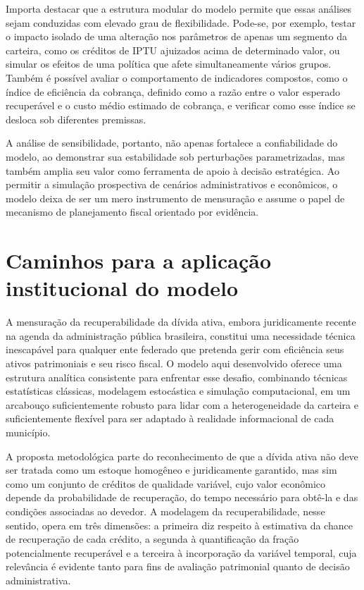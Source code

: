 \documentclass[a4paper,12pt]{article}
\begin{document}
Importa destacar que a estrutura modular do modelo permite que essas análises sejam conduzidas com elevado grau de flexibilidade. Pode-se, por exemplo, testar o impacto isolado de uma alteração nos parâmetros de apenas um segmento da carteira, como os créditos de IPTU ajuizados acima de determinado valor, ou simular os efeitos de uma política que afete simultaneamente vários grupos. Também é possível avaliar o comportamento de indicadores compostos, como o índice de eficiência da cobrança, definido como a razão entre o valor esperado recuperável e o custo médio estimado de cobrança, e verificar como esse índice se desloca sob diferentes premissas.

A análise de sensibilidade, portanto, não apenas fortalece a confiabilidade do modelo, ao demonstrar sua estabilidade sob perturbações parametrizadas, mas também amplia seu valor como ferramenta de apoio à decisão estratégica. Ao permitir a simulação prospectiva de cenários administrativos e econômicos, o modelo deixa de ser um mero instrumento de mensuração e assume o papel de mecanismo de planejamento fiscal orientado por evidência.

\section{Caminhos para a aplicação institucional do modelo}
A mensuração da recuperabilidade da dívida ativa, embora juridicamente recente na agenda da administração pública brasileira, constitui uma necessidade técnica inescapável para qualquer ente federado que pretenda gerir com eficiência seus ativos patrimoniais e seu risco fiscal. O modelo aqui desenvolvido oferece uma estrutura analítica consistente para enfrentar esse desafio, combinando técnicas estatísticas clássicas, modelagem estocástica e simulação computacional, em um arcabouço suficientemente robusto para lidar com a heterogeneidade da carteira e suficientemente flexível para ser adaptado à realidade informacional de cada município.

A proposta metodológica parte do reconhecimento de que a dívida ativa não deve ser tratada como um estoque homogêneo e juridicamente garantido, mas sim como um conjunto de créditos de qualidade variável, cujo valor econômico depende da probabilidade de recuperação, do tempo necessário para obtê-la e das condições associadas ao devedor. A modelagem da recuperabilidade, nesse sentido, opera em três dimensões: a primeira diz respeito à estimativa da chance de recuperação de cada crédito, a segunda à quantificação da fração potencialmente recuperável e a terceira à incorporação da variável temporal, cuja relevância é evidente tanto para fins de avaliação patrimonial quanto de decisão administrativa.
\end{document}
